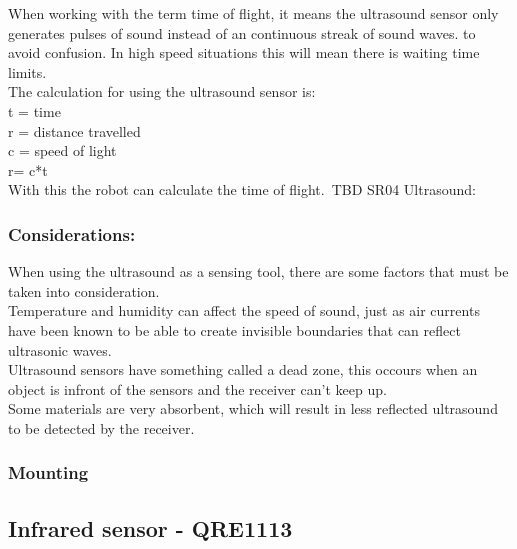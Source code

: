 When working with the term time of flight, it means the ultrasound sensor only generates pulses of sound instead of an continuous streak of sound waves. to avoid confusion. In high speed situations this will mean there is waiting time limits.\\ 

The calculation for using the ultrasound sensor is: \\

t = time\\
r = distance travelled\\
c = speed of light\\

r= c*t\\

With this the robot can calculate the time of flight.\
TBD SR04 Ultrasound:\
\subsubsection{Considerations:}
When using the ultrasound as a sensing tool, there are some factors that must be taken into consideration.\\ Temperature and humidity can affect the speed of sound, just as air currents have been known to be able to create invisible boundaries that can reflect ultrasonic waves.\\
Ultrasound sensors have something called a dead zone, this occours when an object is infront of the sensors and the receiver can't keep up.\\
Some materials are very absorbent, which will result in less reflected ultrasound to be detected by the receiver.

\subsubsection{Mounting}

\subsection{Infrared sensor - QRE1113}

